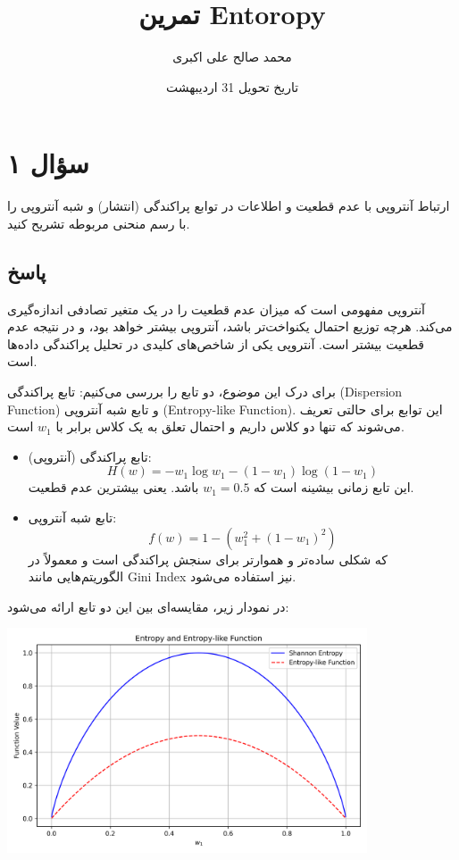 \documentclass[12pt]{article}
\title{تمرین Entoropy}
\author{محمد صالح علی اکبری}
\date{تاریخ تحویل 31 اردیبهشت}
\begin{document}
	
	\maketitle
	
	\section*{سؤال ۱}
		ارتباط آنتروپی با عدم قطعیت و اطلاعات در توابع پراکندگی (انتشار) و شبه آنتروپی را با رسم منحنی مربوطه تشریح کنید.
\subsection*{پاسخ}

آنتروپی مفهومی است که میزان عدم قطعیت را در یک متغیر تصادفی اندازه‌گیری می‌کند. هرچه توزیع احتمال یکنواخت‌تر باشد، آنتروپی بیشتر خواهد بود، و در نتیجه عدم قطعیت بیشتر است. آنتروپی یکی از شاخص‌های کلیدی در تحلیل پراکندگی داده‌ها است.

برای درک این موضوع، دو تابع را بررسی می‌کنیم: تابع پراکندگی (Dispersion Function) و تابع شبه آنتروپی (Entropy-like Function). این توابع برای حالتی تعریف می‌شوند که تنها دو کلاس داریم و احتمال تعلق به یک کلاس برابر با $w_1$ است.

\begin{itemize}
	\item تابع پراکندگی (آنتروپی):
	\[
	H(w) = -w_1 \log w_1 - (1 - w_1) \log (1 - w_1)
	\]
	این تابع زمانی بیشینه است که $w_1 = 0.5$ باشد. یعنی بیشترین عدم قطعیت.
	
	\item تابع شبه آنتروپی:
	\[
	f(w) = 1 - (w_1^2 + (1 - w_1)^2)
	\]
	که شکلی ساده‌تر و هموارتر برای سنجش پراکندگی است و معمولاً در الگوریتم‌هایی مانند Gini Index نیز استفاده می‌شود.
\end{itemize}

در نمودار زیر، مقایسه‌ای بین این دو تابع ارائه می‌شود:

\begin{center}
	\includegraphics[width=0.8\textwidth]{entropy_plot.png}
\end{center}
\end{document}
